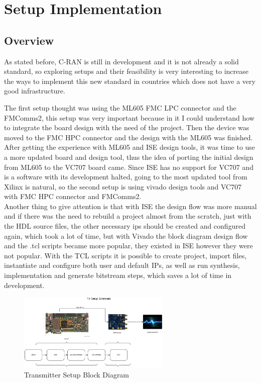 \chapter{Setup Implementation}
\label{chap:implementation}

\section{Overview}

As stated before, C-RAN is still in development and it is not already a solid
standard, so exploring setups and their feasibility is very interesting to
increase the ways to implement this new standard in countries which does not
have a very good infrastructure.

The first setup thought was using the ML605 FMC LPC connector and the FMComms2,
this setup was very important because in it I could understand how to integrate
the board design with the need of the project. Then the device was moved to the
FMC HPC connector and the design with the ML605 was finished.\\

After getting the experience with ML605 and ISE design tools, it was time to use
a more updated board and design tool, thus the idea of porting the initial
design from ML605 to the VC707 board came. Since ISE has no support for VC707
and is a software with its development halted, going to the most updated tool
from Xilinx is natural, so the second setup is using vivado design tools and
VC707 with FMC HPC connector and FMComms2.\\

Another thing to give attention is that with ISE the design flow was more manual
and if there was the need to rebuild a project almost from the scratch, just
with the HDL source files, the other necessary ips should be created and
configured again, which took a lot of time, but with Vivado the block diagram
design flow and the .tcl scripts became more popular, they existed in ISE
however they were not popular. With the TCL scripts it is possible to create
project, import files, instantiate and configure both user and default IPs, as
well as run synthesis, implementation and generate bitstream steps, which saves
a lot of time in development.\\


\begin{figure}[htbp]
    \centering
    \includegraphics[width=0.65\textwidth]{./figures/tx_setup}
    \caption{ Transmitter Setup Block Diagram
    \label{fig:txsetup}}
\end{figure}

